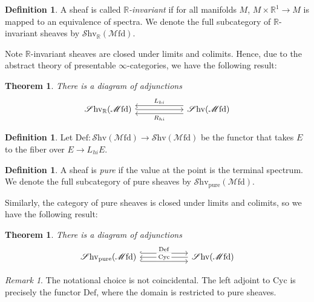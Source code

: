 \documentclass[10pt]{amsart}
\newcommand{\bR}{\mathbb{R}}
\newcommand{\Mfd}{\mathscr{M}\mathrm{fd}}
\newcommand{\Shv}{\mathscr{S}\mathrm{hv}}
\newcommand{\Def}{\mathrm{Def}}
\newcommand{\Cyc}{\mathrm{Cyc}}
\newtheorem{theorem}[equation]{Theorem}
\theoremstyle{definition}
\newtheorem{definition}[equation]{Definition}
\theoremstyle{remark}
\newtheorem{remark}[equation]{Remark}
\numberwithin{equation}{section}
\begin{document}
\begin{definition}
  A sheaf is called \emph{$\mathbb{R}$-invariant} if for all manifolds $M$, $M \times \bR^1 \to M$ is mapped to an equivalence of spectra. We denote the full subcategory of $\mathbb{R}$-invariant sheaves by $\Shv_{\bR}(\Mfd)$.
\end{definition}

Note $\mathbb{R}$-invariant sheaves are closed under limits and colimits. Hence, due to the abstract theory of presentable $\infty$-categories, we have the following result:

\begin{theorem}
 There is a diagram of adjunctions
 \[
 \begin{tikzcd}[column sep=2cm]
 \Shv_{\bR}(\Mfd) \arrow[r, shift left = 2, leftarrow, "L_{hi}"] \arrow[r, hookrightarrow] \arrow[r, shift right = 2, leftarrow, "R_{hi}"'] & \Shv(\Mfd) 
 \end{tikzcd}
 \]
\end{theorem}

\begin{definition}
  Let $\Def\colon \Shv(\Mfd) \to \Shv(\Mfd)$ be the functor that takes $E$ to the fiber over $E \to L_{hi}E$. 
\end{definition}

\begin{definition}
  A sheaf is \emph{pure} if the value at the point is the terminal spectrum. We denote the full subcategory of pure sheaves by $\Shv_{\mathrm{pure}}(\Mfd)$.
\end{definition}

Similarly, the category of pure sheaves is closed under limits and colimits, so we have the following result:

\begin{theorem}
 There is a diagram of adjunctions
 \[
 \begin{tikzcd}[column sep=2cm]
 \Shv_{\mathrm{pure}}(\Mfd) \arrow[r, shift left = 2, "\Def", hookrightarrow] \arrow[r, leftarrow, "\Cyc" description] \arrow[r, shift right = 2, hookrightarrow] & \Shv(\Mfd)
 \end{tikzcd}
 \]
\end{theorem}

\begin{remark}
  The notational choice is not coincidental. The left adjoint to $\Cyc$ is precisely the functor $\Def$, where the domain is restricted to pure sheaves.
\end{remark}
\end{document}
